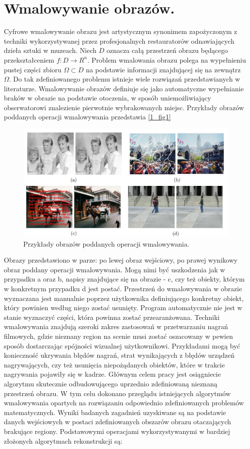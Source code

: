 \documentclass[12pt, twoside, openany]{report}
\theoremstyle{definition}
\begin{document}
\section{Wmalowywanie obrazów.}
Cyfrowe wmalowywanie obrazu jest artystycznym synonimem zapożyczonym z techniki wykorzystywanej przez profesjonalnych restauratorów odnawiających dzieła sztuki w muzeach. Niech $D$ oznacza całą przestrzeń obrazu będącego przekształceniem $f: D \rightarrow R^{n}$. Problem wmalowania obrazu polega na wypełnieniu pustej części zbioru $\Omega \subset D$ na podstawie informacji znajdującej się na zewnątrz $\Omega$. Do tak zdefiniowanego problemu istnieje wiele rozwiązań przedstawianych w literaturze. Wmalowywanie obrazów definiuje się jako automatyczne wypełnianie braków w obrazie na podstawie otoczenia, w sposób uniemożliwiający obserwatorowi znalezienie pierwotnie wybrakowanych miejsc. Przykłady obrazów poddanych operacji wmalowywania przedstawia \autoref{1_fig1} 
\begin{figure}[!h]
	\centering
	\includegraphics[scale=0.7]{rysunki/fig1}
	\caption{Przykłady obrazów poddanych operacji wmalowywania.}
	\label{1_fig1}
\end{figure}
\par
Obrazy przedstawiono w parze: po lewej obraz wejściowy, po prawej wynikowy obraz poddany operacji wmalowywania. Mogą nimi być uszkodzenia jak w przypadku a oraz b, napisy znajdujące się na obrazie - c, czy też obiekty, którym w konkretnym przypadku d jest postać. Przestrzeń do wmalowywania w obrazie wyznaczana jest manualnie poprzez użytkownika definiującego konkretny obiekt, który powinien według niego zostać usunięty. Program automatycznie nie jest w stanie wyznaczyć części, która powinna zostać przearanżowana. 
Techniki wmalowywania znajdują szeroki zakres zastosowań w przetwarzaniu nagrań filmowych, gdzie nieznany region na scenie musi zostać oszacowany w pewien sposób dostarczając spójności wizualnej użytkownikowi. Przykładami mogą być konieczność ukrywania błędów nagrań, strat wynikających z błędów urządzeń nagrywających, czy też usunięcia niepożądanych obiektów, które w trakcie nagrywania pojawiły się w kadrze. Głównym celem pracy jest osiągniecie algorytmu skutecznie odbudowującego uprzednio zdefiniowaną nieznaną przestrzeń obrazu. W tym celu dokonano przeglądu istniejących algorytmów wmalowywania opartych na rozwiązaniu odpowiednio zdefiniowanych problemów matematycznych. Wyniki badanych zagadnień uzyskiwane są na podstawie danych wejściowych w postaci zdefiniowanych obszarów obrazu otaczających brakujące regiony. Podstawowymi operacjami wykorzystywanymi w bardziej złożonych algorytmach rekonstrukcji są:
\end{document}
